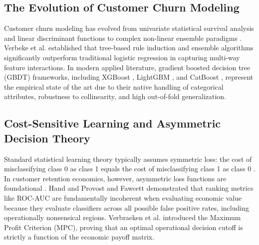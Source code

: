 \documentclass[journal,compsoc]{IEEEtran}
\begin{document}
\subsection{The Evolution of Customer Churn Modeling}
Customer churn modeling has evolved from univariate statistical survival analysis and linear discriminant functions to complex non-linear ensemble paradigms \cite{chen2012business, lemmens2006bagging}. Verbeke et al. \cite{verbeke2011building} established that tree-based rule induction and ensemble algorithms significantly outperform traditional logistic regression in capturing multi-way feature interactions. In modern applied literature, gradient boosted decision tree (GBDT) frameworks, including XGBoost \cite{chen2016xgboost}, LightGBM \cite{ke2017lightgbm}, and CatBoost \cite{dorogush2018catboost}, represent the empirical state of the art due to their native handling of categorical attributes, robustness to collinearity, and high out-of-fold generalization.

\subsection{Cost-Sensitive Learning and Asymmetric Decision Theory}
Standard statistical learning theory typically assumes symmetric loss: the cost of misclassifying class 0 as class 1 equals the cost of misclassifying class 1 as class 0 \cite{elkan2001foundations}. In customer retention economics, however, asymmetric loss functions are foundational \cite{kahneman1979prospect, ling2008cost}. Hand \cite{hand2009measuring} and Provost and Fawcett \cite{provost2013data} demonstrated that ranking metrics like ROC-AUC are fundamentally incoherent when evaluating economic value because they evaluate classifiers across all possible false positive rates, including operationally nonsensical regions. Verbraeken et al. \cite{verbraeken2012novel} introduced the Maximum Profit Criterion (MPC), proving that an optimal operational decision cutoff is strictly a function of the economic payoff matrix.
\end{document}
